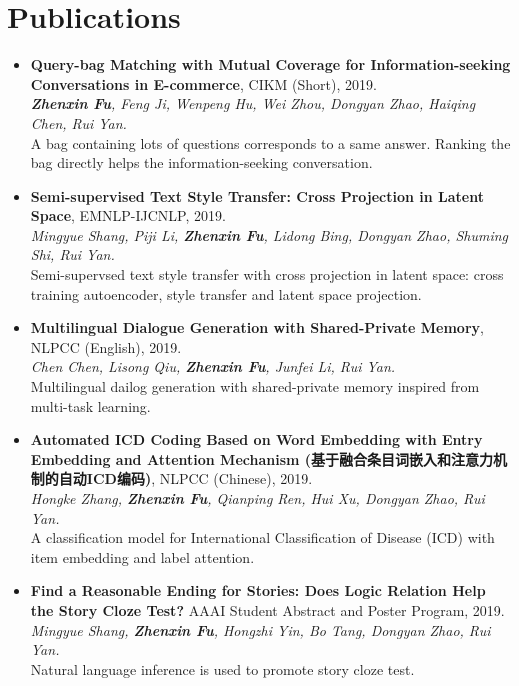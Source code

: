 \documentclass[letterpaper]{article}
\begin{document}
\section*{Publications}
\begin{itemize}


\item \textbf{Query-bag Matching with Mutual Coverage for Information-seeking Conversations in E-commerce}, CIKM (Short), 2019. \\
{\it \textbf{Zhenxin Fu}, Feng Ji, Wenpeng Hu, Wei Zhou, Dongyan Zhao, Haiqing Chen, Rui Yan. } \\
A bag containing lots of questions corresponds to a same answer. Ranking the bag directly helps the information-seeking conversation.

\item \textbf{Semi-supervised Text Style Transfer: Cross Projection in Latent Space}, EMNLP-IJCNLP, 2019. \\
{\it Mingyue Shang, Piji Li, \textbf{Zhenxin Fu}, Lidong Bing, Dongyan Zhao, Shuming Shi, Rui Yan.} \\
Semi-supervsed text style transfer with cross projection in latent space: cross training autoencoder, style transfer and latent space projection.

\item \textbf{Multilingual Dialogue Generation with Shared-Private Memory}, NLPCC (English), 2019. \\
{\it Chen Chen, Lisong Qiu, \textbf{Zhenxin Fu}, Junfei Li, Rui Yan. } \\
Multilingual dailog generation with shared-private memory inspired from multi-task learning.

\item \textbf{Automated ICD Coding Based on Word Embedding with Entry Embedding and Attention Mechanism (基于融合条目词嵌入和注意力机制的自动ICD编码)}, NLPCC (Chinese), 2019. \\
{\it Hongke Zhang, \textbf{Zhenxin Fu}, Qianping Ren, Hui Xu, Dongyan Zhao, Rui Yan.} \\
A classification model for International Classification of Disease (ICD) with item embedding and label attention.

\item \textbf{Find a Reasonable Ending for Stories: Does Logic Relation Help the Story Cloze Test?} AAAI Student Abstract and Poster Program, 2019. \\
{\it Mingyue Shang, \textbf{Zhenxin Fu}, Hongzhi Yin, Bo Tang, Dongyan Zhao, Rui Yan.} \\
Natural language inference is used to promote story cloze test.


\end{itemize}
\end{document}
